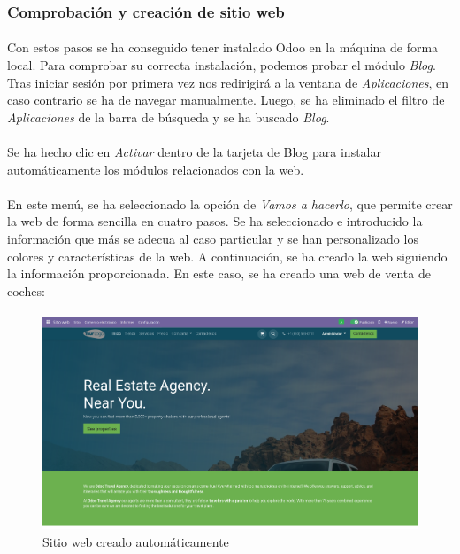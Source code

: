 \subsubsection{Comprobación y creación de sitio web}
\paragraph{}
Con estos pasos se ha conseguido tener instalado Odoo en la máquina de forma local. Para comprobar su correcta instalación, podemos probar el módulo \textit{Blog}. Tras iniciar sesión por primera vez nos redirigirá a la ventana de \textit{Aplicaciones}, en caso contrario se ha de  navegar manualmente. Luego, se ha eliminado el filtro de \textit{Aplicaciones} de la barra de búsqueda y se ha buscado \textit{Blog}.
\paragraph{}
\paragraph{}
Se ha hecho clic en \textit{Activar} dentro de la tarjeta de Blog para instalar automáticamente los módulos relacionados con la web.
\paragraph{}
En este menú, se ha seleccionado la opción de \textit{Vamos a hacerlo}, que permite crear la web de forma sencilla en cuatro pasos. Se ha seleccionado e introducido la información que más se adecua al caso particular y se han personalizado los colores y características de la web. A continuación, se ha creado la web siguiendo la información proporcionada. En este caso, se ha creado una web de venta de coches:
\paragraph{}
\begin{figure}[h]
    \centering
    \includegraphics[width=1\linewidth]{instalacion/web.png}
    \caption{Sitio web creado automáticamente}
    \label{fig:web}
\end{figure}
